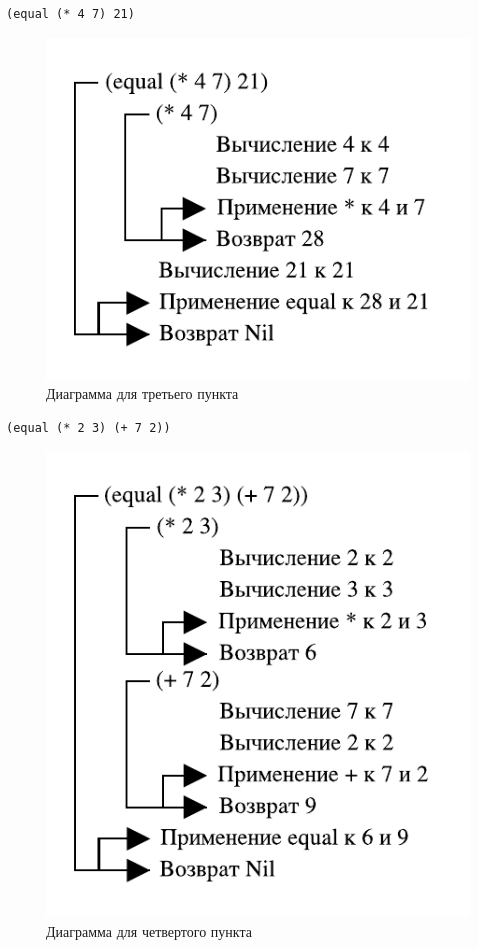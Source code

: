 \begin{lstlisting}
(equal (* 4 7) 21)
\end{lstlisting}

\begin{figure}[H]
    \centering
    \includegraphics{img/01_03.pdf}
    \caption{Диаграмма для третьего пункта}
\end{figure}

\begin{lstlisting}
(equal (* 2 3) (+ 7 2))
\end{lstlisting}

\begin{figure}[H]
    \centering
    \includegraphics{img/01_04.pdf}
    \caption{Диаграмма для четвертого пункта}
\end{figure}

